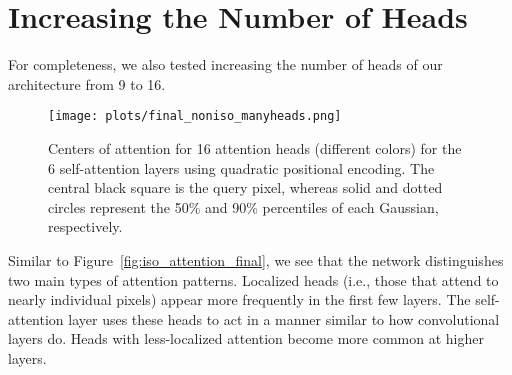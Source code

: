 \documentclass{article} \usepackage{iclr2020_conference,times}
\begin{document}
\section{Increasing the Number of Heads}

For completeness, we also tested increasing the number of heads of our architecture from 9 to 16.

\begin{figure}[h]
  \texttt{[image: plots/final\_noniso\_manyheads.png]}
  \caption{Centers of attention for 16 attention heads (different colors) for the 6 self-attention layers using quadratic positional encoding.
    The central black square is the query pixel, whereas solid and dotted circles represent the 50\% and 90\% percentiles of each Gaussian, respectively.}
  \label{fig:iso_many_heads}
\end{figure}

Similar to Figure~\ref{fig:iso_attention_final}, we see that the network distinguishes two main types of attention patterns. Localized heads (i.e., those that attend to nearly individual pixels) appear  more frequently in the first few layers. The self-attention layer uses these heads to act in a manner similar to how convolutional layers do. Heads with less-localized attention become more common at higher layers.
\end{document}
